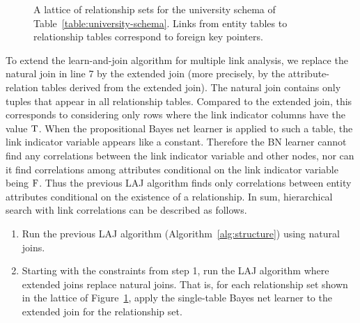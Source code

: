 \documentclass{article}
\begin{document}
\begin{figure}[h]
\begin{center}
\caption{A lattice of relationship sets for the university schema of Table~\ref{table:university-schema}.
 Links from entity tables to relationship tables correspond to foreign key pointers. 
\label{fig:big-lattice}}
\end{center}
\end{figure}



To extend the learn-and-join algorithm for multiple link analysis, we replace the natural join in line 7 by the extended join (more precisely, by the attribute-relation tables derived from the extended join). 
The natural join contains only tuples that appear in all relationship tables. 
Compared to the extended join, this corresponds to considering only rows where the link indicator columns have the value $\mathrm{T}$. 
When the propositional Bayes net learner is applied to such a table, the link indicator variable appears like a constant. 
Therefore the BN learner cannot find any correlations between the link indicator variable and other nodes, 
nor can it find correlations among attributes conditional on the link indicator variable being $\mathrm{F}$. 
Thus the previous LAJ algorithm finds only correlations between entity attributes conditional on the existence of a relationship. 
In sum, hierarchical search with link correlations can be described as follows.

\begin{enumerate}
\item Run the previous LAJ algorithm (Algorithm~\ref{alg:structure}) using natural joins.
\item Starting with the constraints from step 1, run the LAJ algorithm where extended joins replace natural joins. That is, for each relationship set shown in the lattice of Figure~\ref{fig:big-lattice}, apply the single-table Bayes net learner to the extended join for the relationship set.
\end{enumerate}
\end{document}
